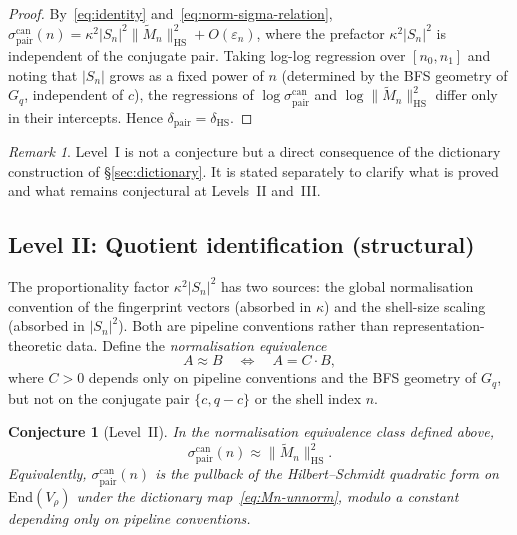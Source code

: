 \documentclass[12pt,a4paper]{article}
\newtheorem{conjecture}[theorem]{Conjecture}
\theoremstyle{definition}
\theoremstyle{remark}
\newtheorem{remark}[theorem]{Remark}
\begin{document}
    \begin{proof}
      By~\eqref{eq:identity} and~\eqref{eq:norm-sigma-relation},
      $\sigma^{\mathrm{can}}_{\mathrm{pair}}(n)
      = \kappa^2 |S_n|^2 \|\widetilde{M}_n\|_{\mathrm{HS}}^2 + O(\varepsilon_n)$,
      where the prefactor $\kappa^2 |S_n|^2$ is independent of the conjugate pair.
      Taking log-log regression over $[n_0, n_1]$ and noting that $|S_n|$ grows
      as a fixed power of $n$ (determined by the BFS geometry of $G_q$, independent
      of $c$), the regressions of $\log \sigma^{\mathrm{can}}_{\mathrm{pair}}$ and
      $\log \|\widetilde{M}_n\|_{\mathrm{HS}}^2$ differ only in their intercepts.
      Hence $\delta_{\mathrm{pair}} = \delta_{\mathrm{HS}}$.
    \end{proof}

    \begin{remark}
      Level~I is not a conjecture but a direct consequence of the dictionary
      construction of §\ref{sec:dictionary}.
      It is stated separately to clarify what is proved and what remains conjectural
      at Levels~II and~III.
    \end{remark}

  \subsection{Level II: Quotient identification (structural)}
    \label{sec:level2}

    The proportionality factor $\kappa^2 |S_n|^2$ has two sources: the global
    normalisation convention of the fingerprint vectors (absorbed in $\kappa$) and
    the shell-size scaling (absorbed in $|S_n|^2$).
    Both are pipeline conventions rather than representation-theoretic data.
    Define the \emph{normalisation equivalence}
    \begin{equation}
      A \approx B \quad \Longleftrightarrow \quad A = C \cdot B,
    \end{equation}
    where $C > 0$ depends only on pipeline conventions and the BFS geometry of $G_q$,
    but not on the conjugate pair $\{c, q-c\}$ or the shell index $n$.

    \begin{conjecture}[Level~II]
      \label{conj:level2}
      In the normalisation equivalence class defined above,
      \begin{equation}
        \sigma^{\mathrm{can}}_{\mathrm{pair}}(n)
        \approx \|\widetilde{M}_n\|_{\mathrm{HS}}^2.
        \label{eq:level2}
      \end{equation}
      Equivalently, $\sigma^{\mathrm{can}}_{\mathrm{pair}}(n)$ is the pullback of
      the Hilbert--Schmidt quadratic form on $\mathrm{End}(V_\rho)$ under the
      dictionary map~\eqref{eq:Mn-unnorm}, modulo a constant depending only on
      pipeline conventions.
    \end{conjecture}
\end{document}
